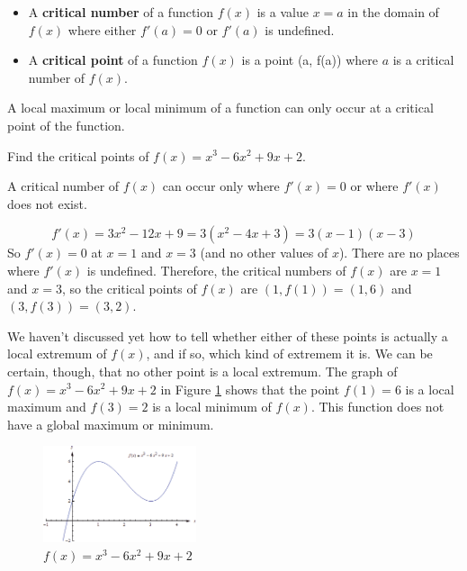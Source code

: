 \begin{definition}
    \begin{itemize}[label={}]
    \item A {\bf critical number} of a function $f(x)$ is a value $x=a$ in the domain of $f(x)$ where either $f'(a)=0$ or $f'(a)$ is undefined.
    \item A {\bf critical point} of a function $f(x)$ is a point {(a, f(a))} where $a$ is a critical number of $f(x)$.
    \end{itemize}
\end{definition}

\begin{theorem}
A local maximum or local minimum of a function can only occur at a critical point of the function.
\end{theorem}

\begin{example}
\label{ex:3-4-critical}
Find the critical points of $f(x)=x^3-6x^2+9x+2$.

\begin{solution} A critical number of $f(x)$ can occur only where $f'(x)=0$ or where $f'(x)$ does not exist.

$$f'(x)=3x^2-12x+9=3(x^2-4x+3)=3(x-1)(x-3)$$
So $f'(x)=0$ at $x=1$ and $x=3$ (and no other values of $x$). There are no places where $f'(x)$ is undefined. Therefore, the critical numbers of $f(x)$ are $x=1$ and $x=3$, so the critical points of $f(x)$ are $(1, f(1)) = (1, 6)$ and $(3, f(3)) = (3, 2)$.
\end{solution}
\end{example}

We haven't discussed yet how to tell whether either of these points is actually a local extremum of $f(x)$, and if so, which kind of extremem it is. We can be certain, though, that no other point is a local extremum. The graph of $f(x)=x^3-6x^2+9x+2$ in Figure \ref{fig:3-4-fx} shows that the point $f(1)=6$ is a local maximum and $f(3)=2$ is a local minimum of $f(x)$. This function does not have a global maximum or minimum.

\begin{figure}[!ht]
  \centering
    \includegraphics[width=0.4\textwidth]{img/chap3/image058.png}
    \caption{$f(x)=x^3-6x^2+9x+2$}
    \label{fig:3-4-fx}
\end{figure}

